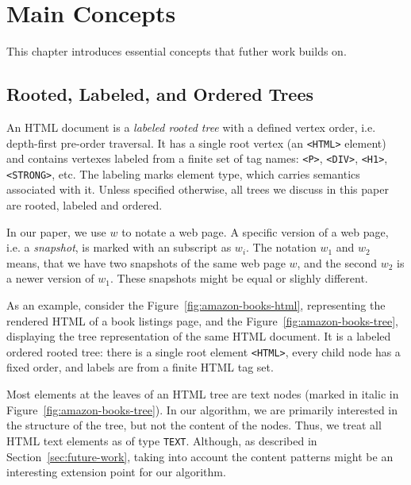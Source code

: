 \chapter{Main Concepts}
\label{ch:concepts}

This chapter introduces essential concepts that futher work builds on.


\section{Rooted, Labeled, and Ordered Trees}

An HTML document is a \emph{labeled rooted tree} with a defined vertex order, i.e. depth-first pre-order traversal. It has a single root vertex (an \texttt{<HTML>} element) and contains vertexes labeled from a finite set of tag names: \texttt{<P>}, \texttt{<DIV>}, \texttt{<H1>}, \texttt{<STRONG>}, etc. The labeling marks element type, which carries semantics associated with it. Unless specified otherwise, all trees we discuss in this paper are rooted, labeled and ordered.

In our paper, we use $w$ to notate a web page. A specific version of a web page, i.e. a \emph{snapshot}, is marked with an subscript as $w_i$. The notation $w_1$ and $w_2$ means, that we have two snapshots of the same web page $w$, and the second $w_2$ is a newer version of $w_1$. These snapshots might be equal or slighly different.

As an example, consider the Figure~\ref{fig:amazon-books-html}, representing the rendered HTML of a book listings page, and the Figure~\ref{fig:amazon-books-tree}, displaying the tree representation of the same HTML document. It is a labeled ordered rooted tree: there is a single root element \texttt{<HTML>}, every child node has a fixed order, and labels are from a finite HTML tag set.

Most elements at the leaves of an HTML tree are text nodes (marked in italic in Figure~\ref{fig:amazon-books-tree}). In our algorithm, we are primarily interested in the structure of the tree, but not the content of the nodes. Thus, we treat all HTML text elements as of type \texttt{TEXT}. Although, as described in Section~\ref{sec:future-work}, taking into account the content patterns might be an interesting extension point for our algorithm.

